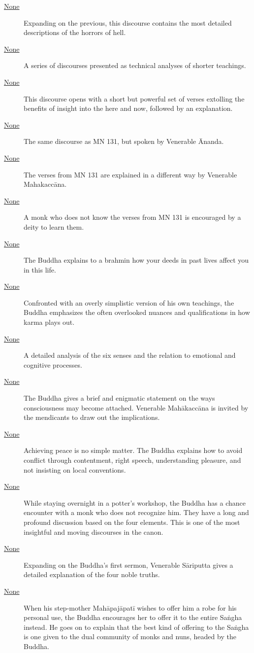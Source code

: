 \documentclass[12pt,openany]{book}%
\begin{document}
\begin{description}
\item[\href{\#mn130}{None}] Expanding on the previous, this discourse contains the most detailed descriptions of the horrors of hell.%
\item[\href{\#mn{-}vibhangavagga}{None}] A series of discourses presented as technical analyses of shorter teachings.%
\item[\href{\#mn131}{None}] This discourse opens with a short but powerful set of verses extolling the benefits of insight into the here and now, followed by an explanation.%
\item[\href{\#mn132}{None}] The same discourse as MN 131, but spoken by Venerable Ānanda.%
\item[\href{\#mn133}{None}] The verses from MN 131 are explained in a different way by Venerable \textsanskrit{Mahakaccāna}.%
\item[\href{\#mn134}{None}] A monk who does not know the verses from MN 131 is encouraged by a deity to learn them.%
\item[\href{\#mn135}{None}] The Buddha explains to a brahmin how your deeds in past lives affect you in this life.%
\item[\href{\#mn136}{None}] Confronted with an overly simplistic version of his own teachings, the Buddha emphasizes the often overlooked nuances and qualifications in how karma plays out.%
\item[\href{\#mn137}{None}] A detailed analysis of the six senses and the relation to emotional and cognitive processes.%
\item[\href{\#mn138}{None}] The Buddha gives a brief and enigmatic statement on the ways consciousness may become attached. Venerable \textsanskrit{Mahākaccāna} is invited by the mendicants to draw out the implications.%
\item[\href{\#mn139}{None}] Achieving peace is no simple matter. The Buddha explains how to avoid conflict through contentment, right speech, understanding pleasure, and not insisting on local conventions.%
\item[\href{\#mn140}{None}] While staying overnight in a potter’s workshop, the Buddha has a chance encounter with a monk who does not recognize him. They have a long and profound discussion based on the four elements. This is one of the most insightful and moving discourses in the canon.%
\item[\href{\#mn141}{None}] Expanding on the Buddha’s first sermon, Venerable \textsanskrit{Sāriputta} gives a detailed explanation of the four noble truths.%
\item[\href{\#mn142}{None}] When his step-mother \textsanskrit{Mahāpajāpatī} wishes to offer him a robe for his personal use, the Buddha encourages her to offer it to the entire \textsanskrit{Saṅgha} instead. He goes on to explain that the best kind of offering to the \textsanskrit{Saṅgha} is one given to the dual community of monks and nuns, headed by the Buddha.%

\end{description}
\end{document}
